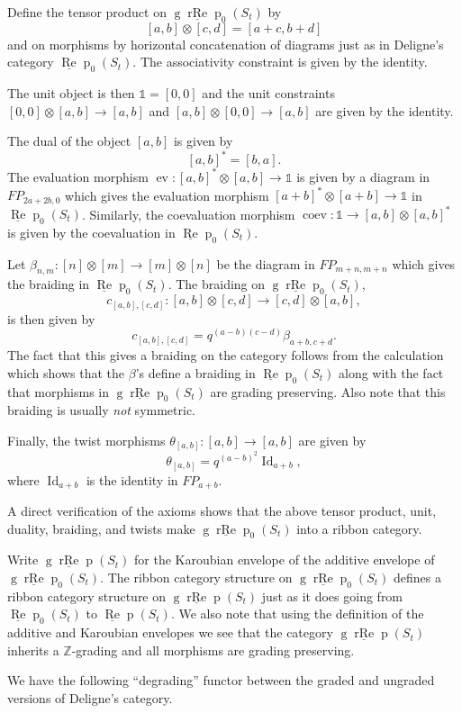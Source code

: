 \documentclass[12pt, reqno]{amsart}
\theoremstyle{definition}
\def\uRep{\underline{\operatorname{Re}}\!\operatorname{p}}
\newcommand{\ev}{\operatorname{ev}}
\newcommand{\coev}{\operatorname{coev}}
\renewcommand{\1}{_{(1)}}
\renewcommand{\2}{_{(2)}}
\newcommand{\3}{_{(3)}}
\newcommand{\4}{_{(4)}}
\newcommand{\Z}{\mathbb{Z}}
\def\gruRep{\operatorname{g}\!\underline{\operatorname{rRe}}\!\operatorname{p}}
\newcommand{\unit}{\ensuremath{\mathds{1}}}
\newcommand{\Id}{\operatorname{Id}}
\begin{document}
Define the tensor product on $\gruRep_{0}(S_{t})$ by 
\[
[a,b] \otimes [c,d] = [a+c, b+d]
\] and on morphisms by horizontal concatenation of diagrams just as in Deligne's category $\uRep_{0}(S_{t})$.   The associativity constraint is given by the identity.  

The unit object is then $\unit = [0,0]$ and the unit constraints $[0,0] \otimes [a,b] \to [a,b]$ and $[a,b] \otimes [0,0] \to [a,b]$ are given by the identity.

The dual of the object $[a,b]$ is given by
\[
[a,b]^{*}=[b,a].
\]  The evaluation morphism $\ev : [a,b]^{*} \otimes [a,b] \to \unit$ is given by a diagram in $FP_{2a+2b,0}$ which gives the evaluation morphism $[a+b]^{*} \otimes [a+b] \to \unit$ in $\uRep_{0}(S_{t})$.  Similarly, the coevaluation morphism $\coev : \unit  \to [a,b] \otimes [a,b]^{*}$ is given by the coevaluation in $\uRep_{0}(S_{t})$.

Let $\beta_{n,m}: [n] \otimes [m] \to [m] \otimes [n]$ be the diagram in $FP_{m+n, m+n}$ which gives the braiding in $\uRep_{0}(S_{t})$.  The braiding on $\gruRep_{0}(S_{t})$,
\[
c_{[a,b],[c,d]}: [a,b] \otimes [c,d] \to [c,d] \otimes [a,b],
\] is then given by 
\[
c_{[a,b],[c,d]} = q^{(a-b)(c-d)}\beta_{a+b,c+d}.
\]  The fact that this gives a braiding on the category follows from the calculation which shows that the $\beta$'s define a braiding in $\uRep_{0}(S_{t})$ along with the fact that morphisms in $\gruRep_{0}(S_{t})$ are grading preserving.  Also note that this braiding is usually \emph{not} symmetric.

Finally, the twist morphisms $\theta_{[a,b]} : [a,b] \to [a,b]$ are given by 
\[
\theta_{[a,b]}= q^{(a-b)^{2}}\Id_{a+b},
\] where $\Id_{a+b}$ is the identity in $FP_{a+b}$.  

A direct verification of the axioms shows that the above tensor product, unit, duality, braiding, and twists make $\gruRep_{0}(S_{t})$ into a ribbon category.  

Write $\gruRep (S_{t})$ for the Karoubian envelope of the additive envelope of $\gruRep_{0}(S_{t})$.  
The ribbon category structure on  $\gruRep_{0}(S_{t})$ defines a ribbon category structure on $\gruRep (S_{t})$ just as it does going from $\uRep_{0}(S_{t})$ to $\uRep (S_{t})$.  We also note that using the definition of the additive and Karoubian envelopes we see that the category $\gruRep (S_{t})$ inherits a $\Z$-grading and all morphisms are grading preserving. 

We have the following ``degrading'' functor between the graded and ungraded versions of Deligne's category.
\end{document}
